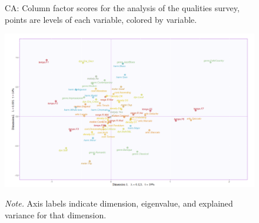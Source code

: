 \documentclass[
]{article}
\begin{document}
\begin{figure}[H]   
  \centering  
  \caption{CA: Column factor scores for the analysis of the qualities survey, points are levels of each variable, colored by variable.}
    \includegraphics{./supmatsimgs/qfactormapsjall.png}
  \label{fig:qjmapsall}
  \caption*{\footnotesize \textit{Note.} Axis labels indicate dimension, eigenvalue, and explained variance for that dimension.}
\end{figure}
\end{document}
